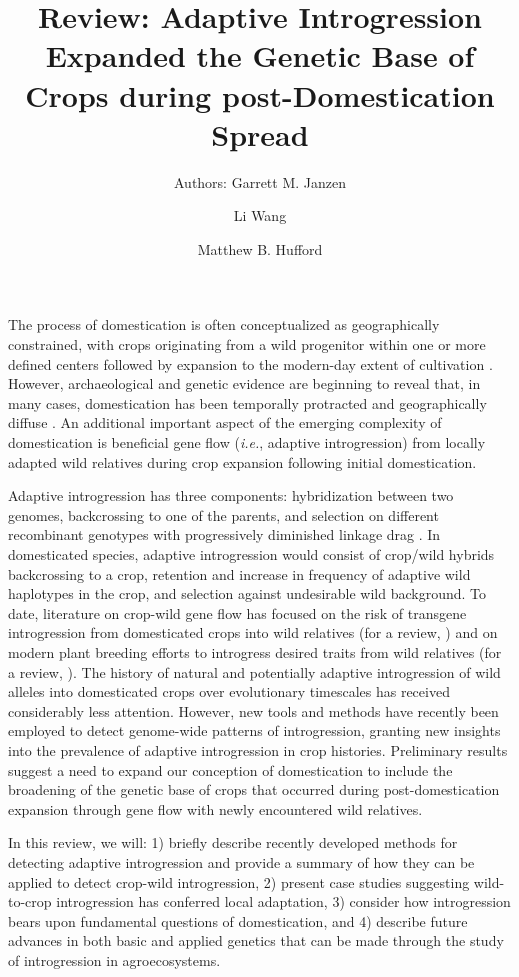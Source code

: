 \documentclass[11pt]{article}
\title{Review: Adaptive Introgression Expanded the Genetic Base of Crops during post-Domestication Spread}
\author[1]{Authors: Garrett M. Janzen}%
\author[1]{Li Wang}
\author[1,*]{Matthew B. Hufford}
\affil[1]{Department of Ecology, Evolution, and Organismal Biology, Iowa State University, Ames, Iowa, USA}
\affil[*]{Correspondence: mhufford@iastate.edu (M.B. Hufford)}
\date{}
\begin{document}
\maketitle


The process of domestication is often conceptualized as geographically constrained, with crops originating from a wild progenitor within one or more defined centers followed by expansion to the modern-day extent of cultivation \cite{Harlan1992}.
However, archaeological and genetic evidence are beginning to reveal that, in many cases, domestication has been temporally protracted and geographically diffuse \cite{brown2009complex, Meyer2016, wang2017, zhou2017, Fuller2014}.
An additional important aspect of the emerging complexity of domestication is beneficial gene flow (\emph{i.e.}, adaptive introgression) from locally adapted wild relatives during crop expansion following initial domestication.


Adaptive introgression has three components: hybridization between two genomes, backcrossing to one of the parents, and selection on different recombinant genotypes with progressively diminished linkage drag \cite{barton2001role, Feuillet200824}.
In domesticated species, adaptive introgression would consist of crop/wild hybrids backcrossing to a crop, retention and increase in frequency of adaptive wild haplotypes in the crop, and selection against undesirable wild background.
To date, literature on crop-wild gene flow has focused on the risk of transgene introgression from domesticated crops into wild relatives (for a review, \cite{stewart2003transgene}) and on modern plant breeding efforts to introgress desired traits from wild relatives (for a review, \cite{Dempewolf2017}).
The history of natural and potentially adaptive introgression of wild alleles into domesticated crops over evolutionary timescales has received considerably less attention.
However, new tools and methods have recently been employed to detect genome-wide patterns of introgression, granting new insights into the prevalence of adaptive introgression in crop histories.
Preliminary results suggest a need to expand our conception of domestication to include the broadening of the genetic base of crops that occurred during post-domestication expansion through gene flow with newly encountered wild relatives.


In this review, we will: 1) briefly describe recently developed methods for detecting adaptive introgression and provide a summary of how they can be applied to detect crop-wild introgression, 2) present case studies suggesting wild-to-crop introgression has conferred local adaptation, 3) consider how introgression bears upon fundamental questions of domestication, and 4) describe future advances in both basic and applied genetics that can be made through the study of introgression in agroecosystems.
\end{document}
